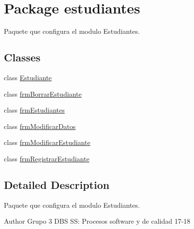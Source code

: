 \hypertarget{namespaceestudiantes}{}\section{Package estudiantes}
\label{namespaceestudiantes}


Paquete que configura el modulo Estudiantes.  


\subsection*{Classes}
\begin{DoxyCompactItemize}
\item 
class \hyperlink{classestudiantes_1_1_estudiante}{Estudiante}
\item 
class \hyperlink{classestudiantes_1_1frm_borrar_estudiante}{frm\+Borrar\+Estudiante}
\item 
class \hyperlink{classestudiantes_1_1frm_estudiantes}{frm\+Estudiantes}
\item 
class \hyperlink{classestudiantes_1_1frm_modificar_datos}{frm\+Modificar\+Datos}
\item 
class \hyperlink{classestudiantes_1_1frm_modificar_estudiante}{frm\+Modificar\+Estudiante}
\item 
class \hyperlink{classestudiantes_1_1frm_registrar_estudiante}{frm\+Registrar\+Estudiante}
\end{DoxyCompactItemize}


\subsection{Detailed Description}
Paquete que configura el modulo Estudiantes. 

\begin{DoxyAuthor}{Author}
Grupo 3 D\+BS SS\+: Procesos software y de calidad 17-\/18 
\end{DoxyAuthor}
